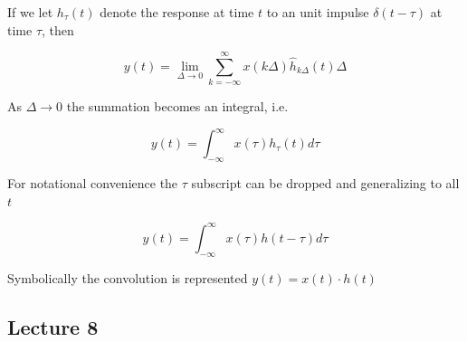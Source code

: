 \documentclass[../notes.tex]{subfiles}
\begin{document}
If we let $ h_\tau (t) $ denote the response at time $ t $ to an unit impulse $ \delta(t - \tau) $ at time $ \tau $, then


\begin{equation}
	y(t) = \lim_{\Delta \to 0} \sum_{k=-\infty}^{\infty} x(k\Delta) \hat{h}_{k\Delta} (t) \Delta
\end{equation}

As $ \Delta \to 0 $ the summation becomes an integral, i.e.

\begin{equation}
	y(t) = \int_{-\infty}^{\infty}   x(\tau) h_{\tau}  (t) d \tau
\end{equation}

For notational convenience the $ \tau $ subscript can be dropped and generalizing to all $ t $ 

\begin{equation}
	y(t) = \int_{-\infty}^{\infty}   x(\tau) h(t-\tau) d \tau
\end{equation}

Symbolically the convolution is represented $ y(t) = x(t) \cdot h(t)$ 




\subsection{Lecture 8}
\end{document}
